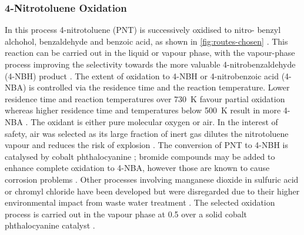 \subsubsection{4-Nitrotoluene Oxidation}
\label{4-NTox}
In this process 4-nitrotoluene (PNT) is successively oxidised to nitro- benzyl alchohol, benzaldehyde and benzoic acid, as shown in \cref{fig:routes-chosen} \cite{hoorn_modelling_2005}. This reaction can be carried out in the liquid or vapour phase, with the vapour-phase process improving the selectivity towards the more valuable 4-nitrobenzaldehyde (4-NBH) product \cite{bruhne_benzaldehyde_2011}. 
The extent of oxidation to 4-NBH or 4-nitrobenzoic acid (4-NBA) is controlled via the residence time and the reaction temperature. Lower residence time and reaction temperatures over \SI{730}{\K} favour partial oxidation whereas higher residence time and temperatures below \SI{500}{\K} result in more 4-NBA \cite{bruhne_benzaldehyde_2011,tan_kinetic_2010}.
The oxidant is either pure molecular oxygen or air. In the interest of safety, air was selected as its large fraction of inert  gas dilutes the nitrotoluene vapour and reduces the risk of explosion \cite{bruhne_benzaldehyde_2011}. 
The conversion of PNT to 4-NBH is catalysed by cobalt phthalocyanine \cite{wendt_reaction_1986}; bromide compounds may be added to enhance complete oxidation to 4-NBA, however those are known to cause corrosion problems \cite{opgrande_benzoic_2003}.
Other processes involving manganese dioxide in sulfuric acid or chromyl chloride have been developed but were disregarded due to their higher environmental impact from waste water treatment \cite{bruhne_benzaldehyde_2011}.
The selected oxidation process is carried out in the vapour phase at \SI{0.5}{\atm} over a solid cobalt phthalocyanine catalyst \cite{chandalia_kinetics_1999}. %



 


